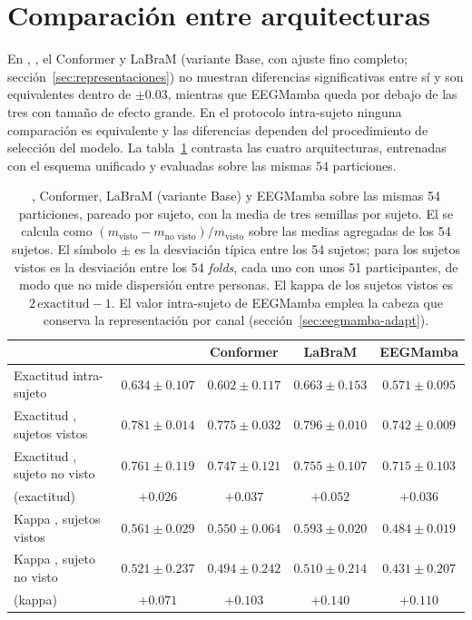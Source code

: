 \section{Comparación entre arquitecturas}
\label{sec:comparacion}

En \loso{}, \eegnet{}, el Conformer y LaBraM \cite{jiang2024labram} (variante Base, con ajuste fino
completo; sección~\ref{sec:representaciones}) no muestran diferencias significativas entre sí y son
equivalentes dentro de $\pm 0.03$, mientras que EEGMamba queda por debajo de las tres con tamaño de
efecto grande. En el protocolo intra-sujeto ninguna comparación es equivalente y las diferencias
dependen del procedimiento de selección del modelo. La tabla~\ref{tab:conformer} contrasta las
cuatro arquitecturas, entrenadas con el esquema unificado y evaluadas sobre las mismas $54$
particiones.

\begin{table}[H]
\centering
\caption{\eegnet{}, Conformer, LaBraM (variante Base) y EEGMamba sobre las mismas 54
particiones, pareado por sujeto, con la media de tres semillas por sujeto. El \dsi{} se calcula como
$(m_{\text{visto}} - m_{\text{no visto}})/m_{\text{visto}}$ sobre las medias
agregadas de los 54 sujetos. El símbolo
$\pm$ es la desviación típica entre los 54 sujetos; para los sujetos vistos es la
desviación entre los 54 \textit{folds}, cada uno con unos 51 participantes, de modo
que no mide dispersión entre personas. El kappa de los sujetos vistos es $2\,\mathrm{exactitud} - 1$.
El valor intra-sujeto de EEGMamba emplea la cabeza que conserva la representación por
canal (sección~\ref{sec:eegmamba-adapt}).}
\label{tab:conformer}
\footnotesize
\setlength{\tabcolsep}{3pt}
\begin{tabular}{lcccc}
\toprule
 & \textbf{\eegnet{}} & \textbf{Conformer} & \textbf{LaBraM} & \textbf{EEGMamba} \\
\midrule
Exactitud intra-sujeto & $0.634 \pm 0.107$ & $0.602 \pm 0.117$ & $0.663 \pm 0.153$ & $0.571 \pm 0.095$ \\
\midrule
Exactitud \loso{}, sujetos vistos & $0.781 \pm 0.014$ & $0.775 \pm 0.032$ & $0.796 \pm 0.010$ & $0.742 \pm 0.009$ \\
Exactitud \loso{}, sujeto no visto & $0.761 \pm 0.119$ & $0.747 \pm 0.121$ & $0.755 \pm 0.107$ & $0.715 \pm 0.103$ \\
\dsi{} (exactitud) & $+0.026$ & $+0.037$ & $+0.052$ & $+0.036$ \\
\midrule
Kappa \loso{}, sujetos vistos & $0.561 \pm 0.029$ & $0.550 \pm 0.064$ & $0.593 \pm 0.020$ & $0.484 \pm 0.019$ \\
Kappa \loso{}, sujeto no visto & $0.521 \pm 0.237$ & $0.494 \pm 0.242$ & $0.510 \pm 0.214$ & $0.431 \pm 0.207$ \\
\dsi{} (kappa) & $+0.071$ & $+0.103$ & $+0.140$ & $+0.110$ \\
\bottomrule
\end{tabular}
\end{table}

